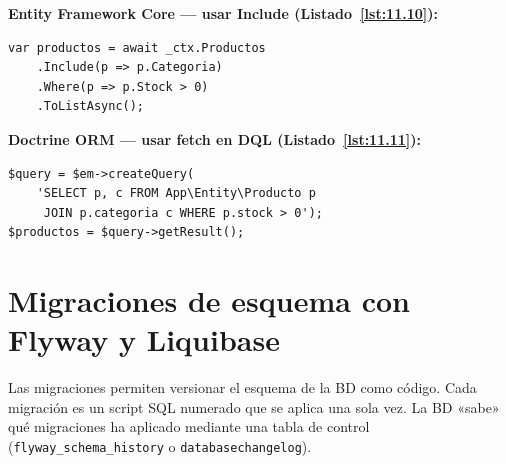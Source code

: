 \documentclass[11pt,a4paper,openany]{book}
\begin{document}
\textbf{Entity Framework Core --- usar Include (Listado~\ref{lst:11.10}):}
\begin{lstlisting}[style=cs,numbers=none,caption={Ejemplo de C\#},label=lst:11.10]
var productos = await _ctx.Productos
    .Include(p => p.Categoria)
    .Where(p => p.Stock > 0)
    .ToListAsync();
\end{lstlisting}

\textbf{Doctrine ORM --- usar fetch en DQL (Listado~\ref{lst:11.11}):}
\begin{lstlisting}[style=php,numbers=none,caption={Ejemplo de PHP},label=lst:11.11]
$query = $em->createQuery(
    'SELECT p, c FROM App\Entity\Producto p
     JOIN p.categoria c WHERE p.stock > 0');
$productos = $query->getResult();
\end{lstlisting}

\section{Migraciones de esquema con Flyway y Liquibase}

Las migraciones permiten versionar el esquema de la BD como código.
Cada migración es un script SQL numerado que se aplica una sola vez.
La BD «sabe» qué migraciones ha aplicado mediante una tabla de control
(\texttt{flyway\_schema\_history} o \texttt{databasechangelog}).
\end{document}
